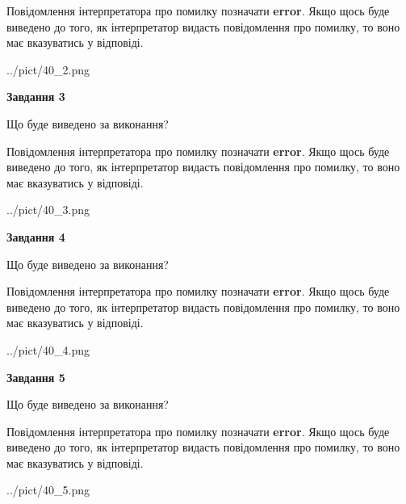 \documentclass[12pt, ukrainian]{article}
\begin{document}
{\begin {large}
Повідомлення інтерпретатора про помилку позначати \textbf{error}.
Якщо щось буде виведено до того, як інтерпретатор видасть повідомлення про помилку, 
то воно має вказуватись у відповіді. \par


\begin{center}
	{../pict/40_2.png}
\end{center}
\newpage

{\begin {center}\textbf{Завдання 3}\end {center}}\par
Що буде виведено за виконання?

Повідомлення інтерпретатора про помилку позначати \textbf{error}.
Якщо щось буде виведено до того, як інтерпретатор видасть повідомлення про помилку, 
то воно має вказуватись у відповіді. \par


\begin{center}
	{../pict/40_3.png}
\end{center}
\newpage

{\begin {center}\textbf{Завдання 4}\end {center}}\par
Що буде виведено за виконання?

Повідомлення інтерпретатора про помилку позначати \textbf{error}.
Якщо щось буде виведено до того, як інтерпретатор видасть повідомлення про помилку, 
то воно має вказуватись у відповіді. \par


\begin{center}
	{../pict/40_4.png}
\end{center}
\newpage

{\begin {center}\textbf{Завдання 5}\end {center}}\par
Що буде виведено за виконання?

Повідомлення інтерпретатора про помилку позначати \textbf{error}.
Якщо щось буде виведено до того, як інтерпретатор видасть повідомлення про помилку, 
то воно має вказуватись у відповіді. \par


\begin{center}
	{../pict/40_5.png}
\end{center}
\newpage


\end{large}}
\end{document}
